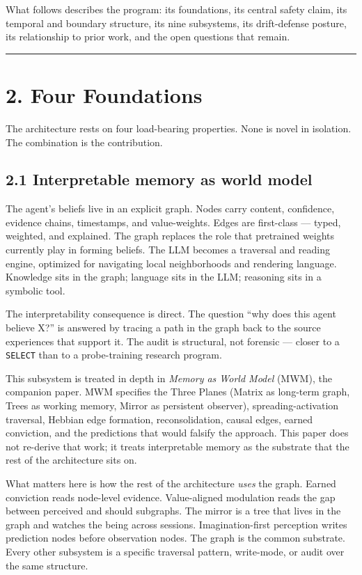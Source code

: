 \documentclass[12pt]{article}
\begin{document}
What follows describes the program: its foundations, its central safety claim, its temporal and boundary structure, its nine subsystems, its drift-defense posture, its relationship to prior work, and the open questions that remain.

\begin{center}\rule{0.5\linewidth}{0.5pt}\end{center}

\section{2. Four Foundations}\label{four-foundations}

The architecture rests on four load-bearing properties. None is novel in isolation. The combination is the contribution.

\subsection{2.1 Interpretable memory as world model}\label{interpretable-memory-as-world-model}

The agent's beliefs live in an explicit graph. Nodes carry content, confidence, evidence chains, timestamps, and value-weights. Edges are first-class --- typed, weighted, and explained. The graph replaces the role that pretrained weights currently play in forming beliefs. The LLM becomes a traversal and reading engine, optimized for navigating local neighborhoods and rendering language. Knowledge sits in the graph; language sits in the LLM; reasoning sits in a symbolic tool.

The interpretability consequence is direct. The question ``why does this agent believe X?'' is answered by tracing a path in the graph back to the source experiences that support it. The audit is structural, not forensic --- closer to a \texttt{SELECT} than to a probe-training research program.

This subsystem is treated in depth in \emph{Memory as World Model} (MWM), the companion paper. MWM specifies the Three Planes (Matrix as long-term graph, Trees as working memory, Mirror as persistent observer), spreading-activation traversal, Hebbian edge formation, reconsolidation, causal edges, earned conviction, and the predictions that would falsify the approach. This paper does not re-derive that work; it treats interpretable memory as the substrate that the rest of the architecture sits on.

What matters here is how the rest of the architecture \emph{uses} the graph. Earned conviction reads node-level evidence. Value-aligned modulation reads the gap between perceived and should subgraphs. The mirror is a tree that lives in the graph and watches the being across sessions. Imagination-first perception writes prediction nodes before observation nodes. The graph is the common substrate. Every other subsystem is a specific traversal pattern, write-mode, or audit over the same structure.
\end{document}
